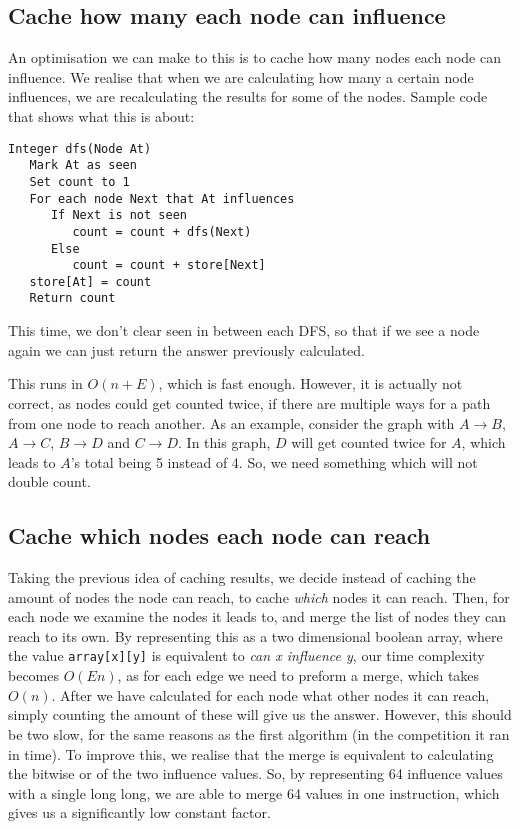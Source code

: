 \subsection*{Cache how many each node can influence}

An optimisation we can make to this is to cache how many nodes each node can influence. We realise that when we are calculating how many a certain node influences, we are recalculating the results for some of the nodes. Sample code that shows what this is about:

\begin{verbatim}
Integer dfs(Node At)
   Mark At as seen
   Set count to 1
   For each node Next that At influences
      If Next is not seen
         count = count + dfs(Next)
      Else
         count = count + store[Next]
   store[At] = count
   Return count
\end{verbatim}

This time, we don't clear seen in between each DFS, so that if we see a node again we can just return the answer previously calculated.

This runs in $O(n + E)$, which is fast enough. However, it is actually not correct, as nodes could get counted twice, if there are multiple ways for a path from one node to reach another. As an example, consider the graph with $A \to B$, $A \to C$, $B \to D$ and $C \to D$. In this graph, $D$ will get counted twice for $A$, which leads to $A$'s total being 5 instead of 4. So, we need something which will not double count.

\subsection*{Cache which nodes each node can reach}

Taking the previous idea of caching results, we decide instead of caching the amount of nodes the node can reach, to cache \emph{which} nodes it can reach. Then, for each node we examine the nodes it leads to, and merge the list of nodes they can reach to its own. By representing this as a two dimensional boolean array, where the value \texttt{array[x][y]} is equivalent to \emph{can x influence y}, our time complexity becomes $O(En)$, as for each edge we need to preform a merge, which takes $O(n)$. After we have calculated for each node what other nodes it can reach, simply counting the amount of these will give us the answer. However, this should be two slow, for the same reasons as the first algorithm (in the competition it ran in time). To improve this, we realise that the merge is equivalent to calculating the bitwise or of the two influence values. So, by representing 64 influence values with a single long long, we are able to merge 64 values in one instruction, which gives us a significantly low constant factor.



